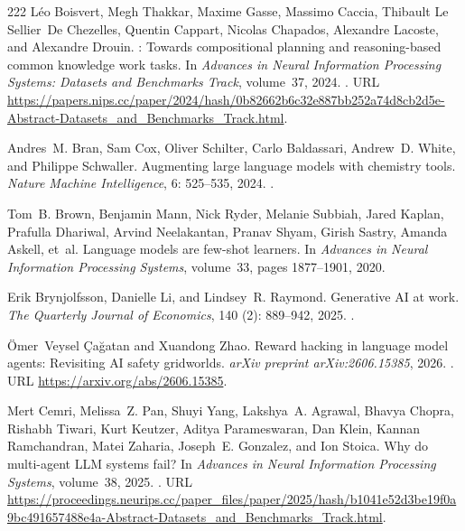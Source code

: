 \begin{thebibliography}{222}
L{\'e}o Boisvert, Megh Thakkar, Maxime Gasse, Massimo Caccia, Thibault Le
  Sellier~De Chezelles, Quentin Cappart, Nicolas Chapados, Alexandre Lacoste,
  and Alexandre Drouin.
: Towards compositional planning and reasoning-based
  common knowledge work tasks.
\newblock In \emph{Advances in Neural Information Processing Systems: Datasets
  and Benchmarks Track}, volume~37, 2024.
\newblock {}.
\newblock URL
  \url{https://papers.nips.cc/paper/2024/hash/0b82662b6c32e887bb252a74d8cb2d5e-Abstract-Datasets_and_Benchmarks_Track.html}.

Andres~M. Bran, Sam Cox, Oliver Schilter, Carlo Baldassari, Andrew~D. White,
  and Philippe Schwaller.
\newblock Augmenting large language models with chemistry tools.
\newblock \emph{Nature Machine Intelligence}, 6: 525--535, 2024.
\newblock {}.

Tom~B. Brown, Benjamin Mann, Nick Ryder, Melanie Subbiah, Jared Kaplan,
  Prafulla Dhariwal, Arvind Neelakantan, Pranav Shyam, Girish Sastry, Amanda
  Askell, et~al.
\newblock Language models are few-shot learners.
\newblock In \emph{Advances in Neural Information Processing Systems},
  volume~33, pages 1877--1901, 2020.

Erik Brynjolfsson, Danielle Li, and Lindsey~R. Raymond.
\newblock Generative {AI} at work.
\newblock \emph{The Quarterly Journal of Economics}, 140 (2):
  889--942, 2025.
\newblock {}.

{\"O}mer~Veysel {\c{C}}a{\u{g}}atan and Xuandong Zhao.
\newblock Reward hacking in language model agents: Revisiting {AI} safety
  gridworlds.
\newblock \emph{arXiv preprint arXiv:2606.15385}, 2026.
\newblock {}.
\newblock URL \url{https://arxiv.org/abs/2606.15385}.

Mert Cemri, Melissa~Z. Pan, Shuyi Yang, Lakshya~A. Agrawal, Bhavya Chopra,
  Rishabh Tiwari, Kurt Keutzer, Aditya Parameswaran, Dan Klein, Kannan
  Ramchandran, Matei Zaharia, Joseph~E. Gonzalez, and Ion Stoica.
\newblock Why do multi-agent {LLM} systems fail?
\newblock In \emph{Advances in Neural Information Processing Systems},
  volume~38, 2025.
\newblock {}.
\newblock URL
  \url{https://proceedings.neurips.cc/paper_files/paper/2025/hash/b1041e52d3be19f0a9bc491657488e4a-Abstract-Datasets_and_Benchmarks_Track.html}.


\end{thebibliography}
